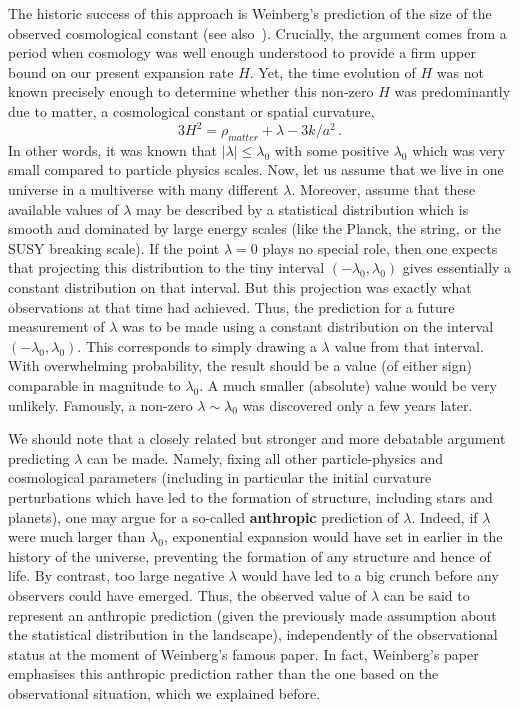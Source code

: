 \documentclass[12pt]{article}
\newcommand{\be}{\begin{equation}}
\newcommand{\ee}{\end{equation}}
\numberwithin{equation}{section}
\begin{document}
The historic success of this approach is Weinberg's prediction of the size of the observed cosmological constant \cite{Weinberg:1987dv} (see also~\cite{Linde:1984ir}). Crucially, the argument comes from a period when cosmology was well enough understood to provide a firm upper bound on our present expansion rate $H$. Yet, the time evolution of $H$ was not known precisely enough to determine whether this non-zero $H$ was predominantly due to matter, a cosmological constant or spatial curvature,
\be
3H^2=\rho_{matter}+\lambda-3k/a^2\,.
\ee
In other words, it was known that $|\lambda|\leq \lambda_0$ with some positive $\lambda_0$ which was very small compared to particle physics scales. Now, let us assume that we live in one universe in a multiverse with many different $\lambda$. Moreover, assume that these available values of $\lambda$ may be described by a statistical distribution which is smooth and dominated by large energy scales (like the Planck, the string, or the SUSY breaking scale). If the point $\lambda=0$ plays no special role, then one expects that projecting this distribution to the tiny interval $(-\lambda_0,\lambda_0)$
gives essentially a constant distribution on that interval. But this projection was exactly what observations at that time had achieved. Thus, the prediction for a future measurement of $\lambda$ was to be made using a constant distribution on the interval $(-\lambda_0,\lambda_0)$. This corresponds to simply drawing a $\lambda$ value from that interval. With overwhelming probability, the result should be a value (of either sign) comparable in magnitude to $\lambda_0$. A much smaller (absolute) value would be very unlikely. Famously, a non-zero $\lambda\sim \lambda_0$ was discovered only a few years later.

We should note that a closely related but stronger and more debatable argument predicting $\lambda$ can be made. Namely, fixing all other particle-physics and cosmological parameters (including in particular the initial curvature perturbations which have led to the formation of structure, including stars and planets), one may argue for a so-called {\bf anthropic} prediction of $\lambda$. Indeed, if $\lambda$ were much larger than $\lambda_0$, exponential expansion would have set in earlier in the history of the universe, preventing the formation of any structure and hence of life. By contrast, too large negative $\lambda$ would have led to a big crunch before any observers could have emerged. Thus, the observed value of $\lambda$ can be said to represent an anthropic prediction (given the previously made assumption about the statistical distribution in the landscape), independently of the observational status at the moment of Weinberg's famous paper. In fact, Weinberg's paper emphasises this anthropic prediction rather than the one based on the observational situation, which we explained before.
\end{document}
